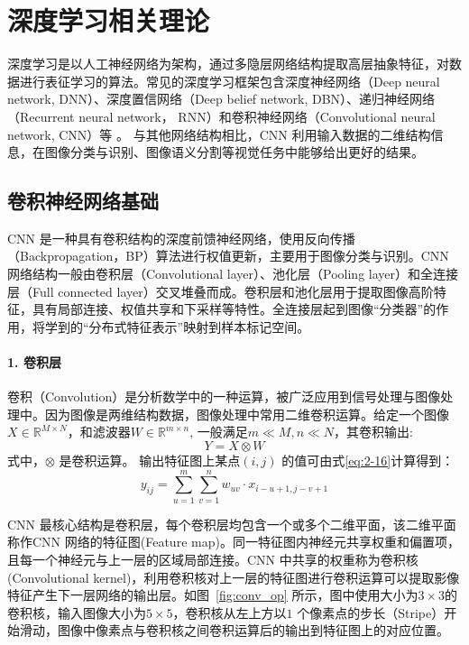 
\chapter{深度学习相关理论}
\label{cha:chap02}
深度学习是以人工神经网络为架构，通过多隐层网络结构提取高层抽象特征，对数据进行表征学习的算法。常见的深度学习框架包含深度神经网络（Deep neural network, DNN）、深度置信网络（Deep belief network, DBN）、递归神经网络（Recurrent neural network， RNN）和卷积神经网络（Convolutional neural network, CNN）等\cite{krizhevsky2012imagenet} 。 与其他网络结构相比，CNN 利用输入数据的二维结构信息，在图像分类与识别、图像语义分割等视觉任务中能够给出更好的结果。

\section{卷积神经网络基础}
\label{sec:chap02-1}

CNN 是一种具有卷积结构的深度前馈神经网络，使用反向传播（Backpropagation，BP）算法进行权值更新，主要用于图像分类与识别。CNN 网络结构一般由卷积层（Convolutional layer）、池化层（Pooling layer）和全连接层（Full connected layer）交叉堆叠而成。卷积层和池化层用于提取图像高阶特征，具有局部连接、权值共享和下采样等特性。全连接层起到图像“分类器”的作用，将学到的“分布式特征表示”映射到样本标记空间。

\subsubsection*{1. 卷积层}
\label{subsec:chap02-2-1-1}
卷积（Convolution）是分析数学中的一种运算，被广泛应用到信号处理与图像处理中。因为图像是两维结构数据，图像处理中常用二维卷积运算。给定一个图像$X \in \mathbb{R}^{M \times N}$，和滤波器$W \in \mathbb{R}^{m \times n}$, 一般满足$m \ll M, n \ll N$，其卷积输出:
\begin{equation}
  \label{eq:2-15}
  Y = X \otimes W
\end{equation}
式中，$\otimes$ 是卷积运算。 输出特征图上某点$(i,j)$ 的值可由式\ref{eq:2-16}计算得到：
\begin{equation}
  \label{eq:2-16}
  y_{ij} = \sum_{u=1}^m\sum_{v=1}^n w_{uv}\cdot x_{i-u+1,j-v+1}
\end{equation}

CNN 最核心结构是卷积层，每个卷积层均包含一个或多个二维平面，该二维平面称作CNN 网络的特征图(Feature map)。同一特征图内神经元共享权重和偏置项，且每一个神经元与上一层的区域局部连接。CNN 中共享的权重称为卷积核(Convolutional kernel)，利用卷积核对上一层的特征图进行卷积运算可以提取影像特征产生下一层网络的输出层。如图~\ref{fig:conv_op} 所示，图中使用大小为$3\times3$的卷积核，输入图像大小为$5\times5$，卷积核从左上方以$1$ 个像素点的步长（Stripe）开始滑动，图像中像素点与卷积核之间卷积运算后的输出到特征图上的对应位置。

